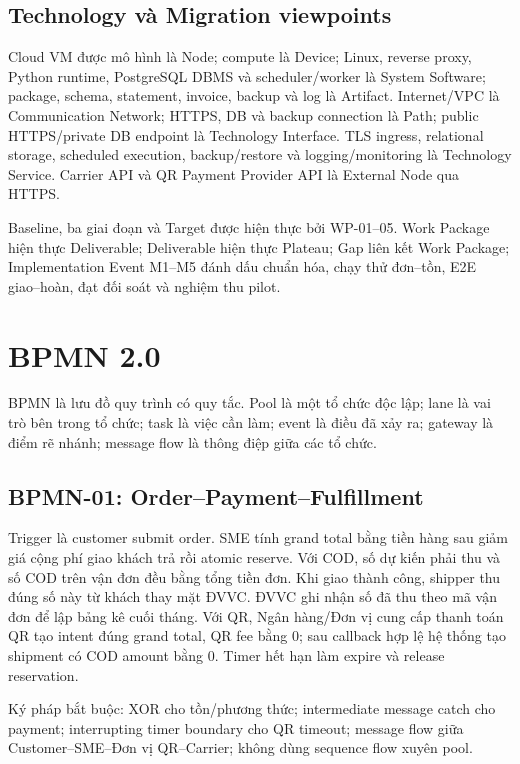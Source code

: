 \documentclass[12pt,a4paper]{report}
\begin{document}
\section{Technology và Migration viewpoints}
Cloud VM được mô hình là Node; compute là Device; Linux, reverse proxy, Python runtime, PostgreSQL DBMS và scheduler/worker là System Software; package, schema, statement, invoice, backup và log là Artifact. Internet/VPC là Communication Network; HTTPS, DB và backup connection là Path; public HTTPS/private DB endpoint là Technology Interface. TLS ingress, relational storage, scheduled execution, backup/restore và logging/monitoring là Technology Service. Carrier API và QR Payment Provider API là External Node qua HTTPS.

Baseline, ba giai đoạn và Target được hiện thực bởi WP-01--05. Work Package hiện thực Deliverable; Deliverable hiện thực Plateau; Gap liên kết Work Package; Implementation Event M1--M5 đánh dấu chuẩn hóa, chạy thử đơn--tồn, E2E giao--hoàn, đạt đối soát và nghiệm thu pilot.

\chapter{BPMN 2.0}

BPMN là lưu đồ quy trình có quy tắc. Pool là một tổ chức độc lập; lane là vai trò bên trong tổ chức; task là việc cần làm; event là điều đã xảy ra; gateway là điểm rẽ nhánh; message flow là thông điệp giữa các tổ chức.

\section{BPMN-01: Order--Payment--Fulfillment}
Trigger là customer submit order. SME tính grand total bằng tiền hàng sau giảm giá cộng phí giao khách trả rồi atomic reserve. Với COD, số dự kiến phải thu và số COD trên vận đơn đều bằng tổng tiền đơn. Khi giao thành công, shipper thu đúng số này từ khách thay mặt ĐVVC. ĐVVC ghi nhận số đã thu theo mã vận đơn để lập bảng kê cuối tháng. Với QR, Ngân hàng/Đơn vị cung cấp thanh toán QR tạo intent đúng grand total, QR fee bằng 0; sau callback hợp lệ hệ thống tạo shipment có COD amount bằng 0. Timer hết hạn làm expire và release reservation.

Ký pháp bắt buộc: XOR cho tồn/phương thức; intermediate message catch cho payment; interrupting timer boundary cho QR timeout; message flow giữa Customer--SME--Đơn vị QR--Carrier; không dùng sequence flow xuyên pool.
\end{document}
